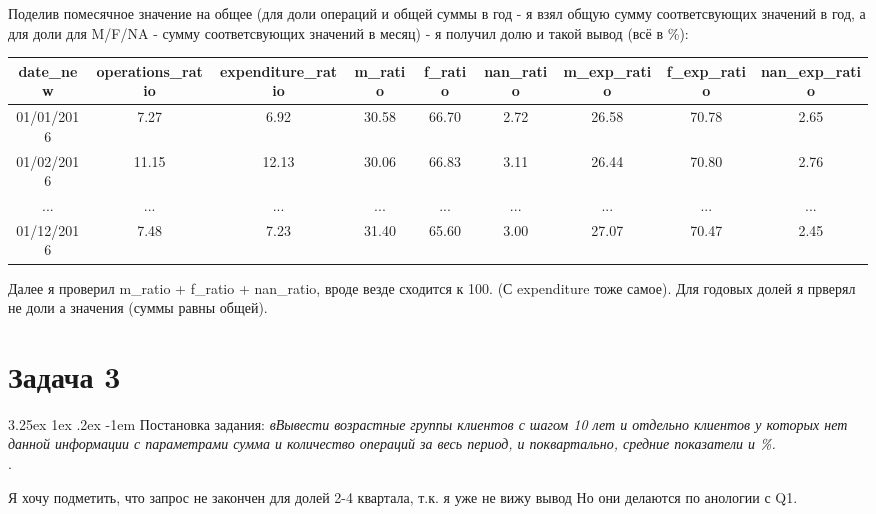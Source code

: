 \documentclass[12pt, a3paper]{article}
\makeatletter
\renewcommand\paragraph{\@startsection{paragraph}{5}{\z@}%
  {3.25ex \@plus1ex \@minus.2ex}%
  {-1em}%
  {\normalfont\normalsize\bfseries}}
\makeatother
\begin{document}
\noindent
Поделив помесячное значение на общее (для доли операций и общей суммы в год - я взял
общую сумму соответсвующих значений в год, а для доли для M/F/NA - сумму соответсвующих значений в месяц) - я получил долю и такой вывод (всё в \%):

\begin{table}[!h]
    \begin{tabular}{|c|c|c|c|c|c|c|c|c|}
    \hline
    date\_new  & operations\_ratio & expenditure\_ratio & m\_ratio & f\_ratio & nan\_ratio & m\_exp\_ratio & f\_exp\_ratio & nan\_exp\_ratio \\ \hline
    01/01/2016 & 7.27              & 6.92               & 30.58    & 66.70    & 2.72       & 26.58         & 70.78         & 2.65            \\ \hline
    01/02/2016 & 11.15             & 12.13              & 30.06    & 66.83    & 3.11       & 26.44         & 70.80         & 2.76            \\ \hline
    ...        & ...               & ...                & ...      & ...      & ...        & ...           & ...           & ...             \\ \hline
    01/12/2016 & 7.48              & 7.23               & 31.40    & 65.60    & 3.00       & 27.07         & 70.47         & 2.45            \\ \hline
    \end{tabular}
\end{table}

\noindent
Далее я проверил m\_ratio + f\_ratio + nan\_ratio, вроде везде сходится к 100. (С expenditure тоже самое).
Для годовых долей я прверял не доли а значения (суммы равны общей).

\section{Задача 3}
\paragraph{Постановка задания:} \emph{вВывести возрастные группы клиентов с шагом 10 лет и отдельно клиентов у которых нет данной информации с параметрами сумма и количество операций за весь период, и поквартально, средние показатели и \%.}
\\[0.1cm]. 

\noindent
Я хочу подметить, что запрос не закончен для долей 2-4 квартала, т.к. я уже не вижу вывод
Но они делаются по анологии с Q1.
\end{document}
